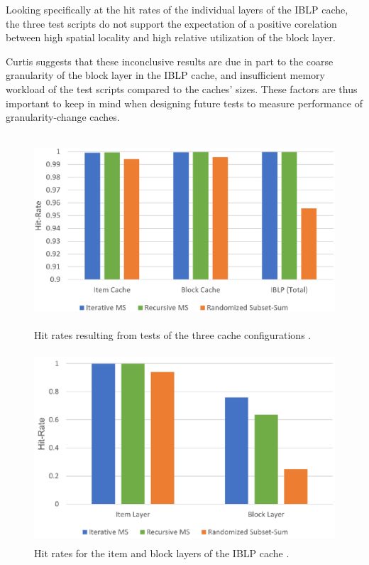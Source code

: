 \documentclass[12pt,twoside]{reedthesis}
\begin{document}
	Looking specifically at the hit rates of the individual layers of the IBLP cache, the three test scripts do not support the expectation of a positive corelation between high spatial locality and high relative utilization of the block layer.

	Curtis suggests that these inconclusive results are due in part to the coarse granularity of the block layer in the IBLP cache, and insufficient memory workload of the test scripts compared to the caches' sizes. These factors are thus important to keep in mind when designing future tests to measure performance of granularity-change caches.

	\newpage
	\null
	\vfill

	\begin{figure}[H]
		\centering
		\includegraphics[height=2.8in]{figures/curtis_cache_hit_rates.png}
		\caption{Hit rates resulting from tests of the three cache configurations \cite{curtis}.}
	\end{figure}

	\vfill

	\begin{figure}[H]
		\centering
		\includegraphics[height=2.8in]{figures/curtis_layer_hit_rates.png}
		\caption{Hit rates for the item and block layers of the IBLP cache \cite{curtis}.}
	\end{figure}
\end{document}
